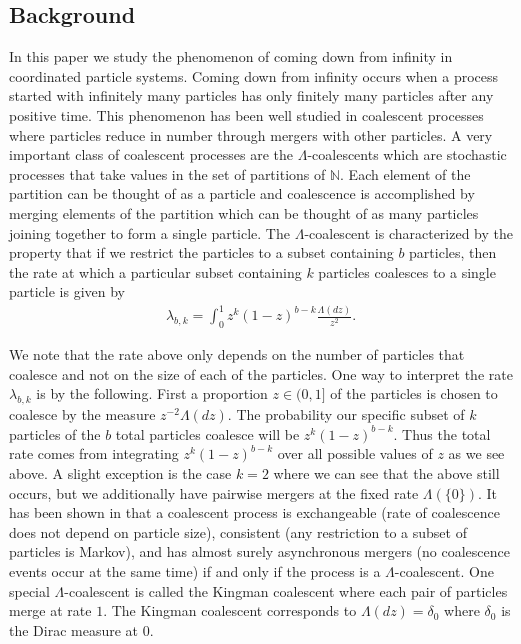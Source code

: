\documentclass[11pt]{article}
\theoremstyle{definition}
\newcommand{\N}{\mathbb{N}}
\begin{document}
\subsection{Background}

In this paper we study the phenomenon of coming down from infinity in coordinated particle systems. Coming down from infinity occurs when a process started with infinitely many particles has only finitely many particles after any positive time. This phenomenon has been well studied in coalescent processes where particles reduce in number through mergers with other particles. A very important class of coalescent processes are the $\Lambda$-coalescents which are stochastic processes that take values in the set of partitions of $\N$. Each element of the partition can be thought of as a particle and coalescence is accomplished by merging elements of the partition which can be thought of as many particles joining together to form a single particle. The $\Lambda$-coalescent is characterized by the property that if we restrict the particles to a subset containing $b$ particles, then the rate at which a particular subset containing $k$ particles coalesces to a single particle is given by
%
\begin{align*}
    \lambda_{b,k} = \int_0^1 z^{k}(1-z)^{b-k} \frac{\Lambda(dz)}{z^2}.
\end{align*}

\noindent We note that the rate above only depends on the number of particles that coalesce and not on the size of each of the particles. One way to interpret the rate $\lambda_{b,k}$ is by the following. First a proportion $z \in (0,1]$ of the particles is chosen to coalesce by the measure $z^{-2}\Lambda(dz)$. The probability our specific subset of $k$ particles of the $b$ total particles coalesce will be $z^{k}(1-z)^{b-k}$. Thus the total rate comes from integrating $z^{k}(1-z)^{b-k}$ over all possible values of $z$ as we see above. A slight exception is the case $k = 2$ where we can see that the above still occurs, but we additionally have pairwise mergers at the fixed rate $\Lambda(\{0\})$. It has been shown in \cite{pitmanlambda} that a coalescent process is exchangeable (rate of coalescence does not depend on particle size), consistent (any restriction to a subset of particles is Markov), and has almost surely asynchronous mergers (no coalescence events occur at the same time) if and only if the process is a $\Lambda$-coalescent. One special $\Lambda$-coalescent is called the Kingman coalescent where each pair of particles merge at rate $1$. The Kingman coalescent corresponds to $\Lambda(dz) = \delta_0$ where $\delta_0$ is the Dirac measure at $0$.
\medskip
\end{document}
